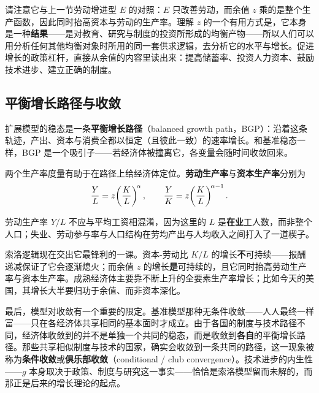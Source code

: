 请注意它与上一节劳动增进型 $E$ 的对照：$E$ 只改善劳动，而余值 $z$ 乘的是整个生产函数，因此同时抬高资本与劳动的生产率。理解 $z$ 的一个有用方式是，它本身是一种\textbf{结果}——是对教育、研究与制度的投资所形成的均衡产物——所以人们可以用分析任何其他均衡对象时所用的同一套供求逻辑，去分析它的水平与增长。促进增长的政策杠杆，直接从余值的内容里读出来：提高储蓄率、投资人力资本、鼓励技术进步、建立正确的制度。

\subsection{平衡增长路径与收敛}

扩展模型的稳态是一条\textbf{平衡增长路径}（balanced growth path，BGP）：沿着这条轨迹，产出、资本与消费全都以恒定（且彼此一致）的速率增长。和基准稳态一样，BGP 是一个吸引子——若经济体被撞离它，各变量会随时间收敛回来。

两个生产率度量有助于在路径上给经济体定位。\textbf{劳动生产率}与\textbf{资本生产率}分别为
\[
\frac{Y}{L} = z\!\left(\frac{K}{L}\right)^{\!\alpha},
\qquad
\frac{Y}{K} = z\!\left(\frac{K}{L}\right)^{\!\alpha - 1}.
\]

\begin{remark}[劳动生产率不是工资]
劳动生产率 $Y/L$ 不应与平均工资相混淆，因为这里的 $L$ 是\textbf{在业}工人数，而非整个人口；失业、劳动参与率与人口结构在劳均产出与人均收入之间打入了一道楔子。
\end{remark}

索洛逻辑现在交出它最锋利的一课。资本-劳动比 $K/L$ 的增长\textbf{不}可持续——报酬递减保证了它会逐渐熄火；而余值 $z$ 的增长\textbf{是}可持续的，且它同时抬高劳动生产率与资本生产率。成熟经济体主要靠不断上升的全要素生产率增长；比如今天的美国，其增长大半要归功于余值、而非资本深化。

最后，模型对收敛有一个重要的限定。基准模型那种无条件收敛——人人最终一样富——只在各经济体共享相同的基本面时才成立。由于各国的制度与技术路径不同，经济体收敛到的并不是单独一个共同的稳态，而是收敛到\textbf{各自}的平衡增长路径。那些共享相似制度与技术的国家，确实会收敛到一条共同的路径，这一现象被称为\textbf{条件收敛}或\textbf{俱乐部收敛}（conditional / club convergence）。技术进步的内生性——$g$ 本身取决于政策、制度与研究这一事实——恰恰是索洛模型留而未解的，而那正是后来的增长理论的起点。

